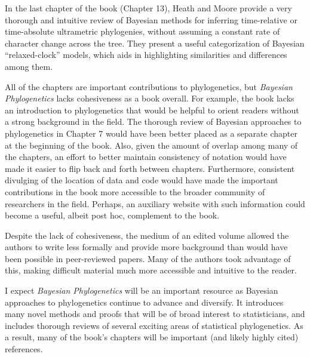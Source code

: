 \documentclass[letterpaper,12pt]{article}
\newcommand{\booktitle}{\textit{Bayesian Phylogenetics}\xspace}
\begin{document}
In the last chapter of the book (Chapter 13),
Heath and Moore provide a very thorough and intuitive review of Bayesian
methods for inferring time-relative or time-absolute ultrametric phylogenies,
without assuming a constant rate of character change across the tree.
They present a useful categorization of Bayesian ``relaxed-clock'' models,
which aids in highlighting similarities and differences among them.

All of the chapters are important contributions to phylogenetics, but
\booktitle lacks cohesiveness as a book overall.
For example, the book lacks an introduction to phylogenetics that would be
helpful to orient readers without a strong background in the field.
The thorough review of Bayesian approaches to phylogenetics in Chapter 7 would
have been better placed as a separate chapter at the beginning of the book.
Also, given the amount of overlap among many of the chapters, an effort to
better maintain consistency of notation would have made it easier to flip back
and forth between chapters.
Furthermore, consistent divulging of the location of data and code would have
made the important contributions in the book more accessible to the broader
community of researchers in the field.
Perhaps, an auxiliary website with such information could become a useful,
albeit post hoc, complement to the book.

Despite the lack of cohesiveness, the medium of an edited volume allowed the
authors to write less formally and provide more background than would have been
possible in peer-reviewed papers.
Many of the authors took advantage of this, making difficult material much more
accessible and intuitive to the reader.

I expect \booktitle will be an important resource as Bayesian approaches to
phylogenetics continue to advance and diversify.
It introduces many novel methods and proofs that will be of broad interest to
statisticians, and includes thorough reviews of several exciting areas of
statistical phylogenetics.
As a result, many of the book's chapters will be important (and likely highly
cited) references.



\end{document}
